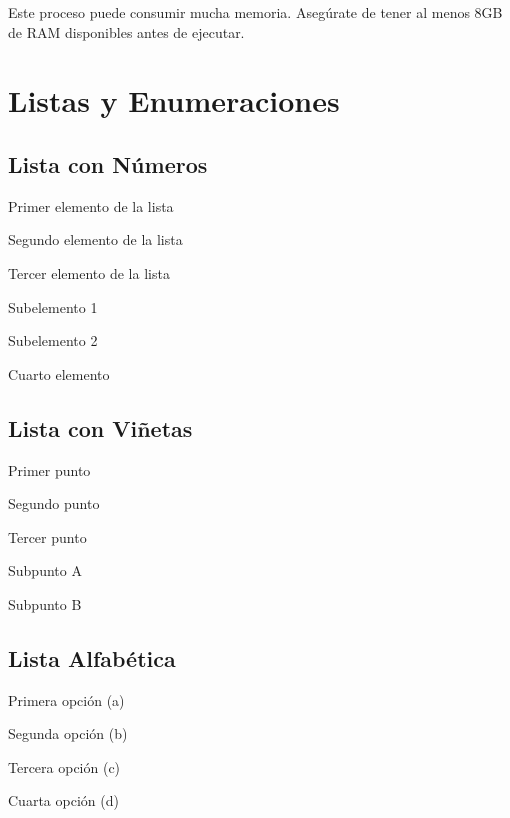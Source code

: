 \documentclass{template_pid}
\begin{document}
\begin{advertencia}
Este proceso puede consumir mucha memoria. Asegúrate de tener
al menos 8GB de RAM disponibles antes de ejecutar.
\end{advertencia}

\section{Listas y Enumeraciones}

\subsection{Lista con Números}

\begin{enumeracion}
    \item Primer elemento de la lista
    \item Segundo elemento de la lista
    \item Tercer elemento de la lista
    \begin{enumeracion}
        \item Subelemento 1
        \item Subelemento 2
    \end{enumeracion}
    \item Cuarto elemento
\end{enumeracion}

\subsection{Lista con Viñetas}

\begin{listapuntos}
    \item Primer punto
    \item Segundo punto
    \item Tercer punto
    \begin{listapuntos}
        \item Subpunto A
        \item Subpunto B
    \end{listapuntos}
\end{listapuntos}

\subsection{Lista Alfabética}

\begin{listaalfabetica}
    \item Primera opción (a)
    \item Segunda opción (b)
    \item Tercera opción (c)
    \item Cuarta opción (d)
\end{listaalfabetica}
\end{document}
